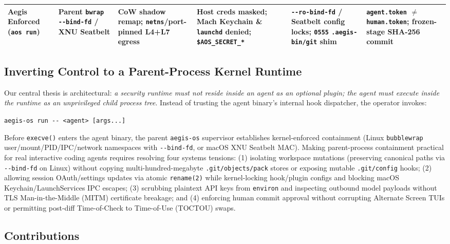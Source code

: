 \documentclass[10pt,twocolumn]{article}
\begin{document}
\begin{table}[!t]
\begin{tabularx}{\textwidth}{@{}l>{\raggedright\arraybackslash}p{2.62cm}YYYY@{}}
\midrule
\textbf{Aegis Enforced} (\texttt{aos run}) & \textbf{Parent \texttt{bwrap -\/-bind-fd} / XNU Seatbelt} & \textbf{CoW shadow remap; \texttt{netns}/port-pinned L4+L7 egress} & \textbf{Host creds masked; Mach Keychain \& \texttt{launchd} denied; \texttt{\$AOS\_SECRET\_*}} & \textbf{\texttt{-\/-ro-bind-fd} / Seatbelt config locks; \texttt{0555} \texttt{.aegis-bin/git} shim} & \textbf{\texttt{agent.token} $\neq$ \texttt{human.token}; frozen-stage SHA-256 commit} \\
\bottomrule
\end{tabularx}
\end{table}

\subsection{Inverting Control to a Parent-Process Kernel Runtime}

Our central thesis is architectural: \emph{a security runtime must not reside inside an agent as an optional plugin; the agent must execute inside the runtime as an unprivileged child process tree}. Instead of trusting the agent binary's internal hook dispatcher, the operator invokes:
\begin{center}
{\footnotesize\texttt{aegis-os run -\/- <agent> [args...]}}
\end{center}
Before \texttt{execve()} enters the agent binary, the parent \texttt{aegis-os} supervisor establishes kernel-enforced containment (Linux \texttt{bubblewrap}~\cite{containers2024bubblewrap} user/\allowbreak mount/\allowbreak PID/\allowbreak IPC/\allowbreak network namespaces with \texttt{-\/-bind-fd}, or macOS XNU Seatbelt MAC). Making parent-process containment practical for real interactive coding agents requires resolving four systems tensions: (1) isolating workspace mutations (preserving canonical paths via \texttt{-\/-bind-fd} on Linux) without copying multi-hundred-megabyte \texttt{.git/objects/pack} stores or exposing mutable \texttt{.git/config} hooks; (2) allowing session OAuth/settings updates via atomic \texttt{rename(2)} while kernel-locking hook/plugin configs and blocking macOS Keychain/LaunchServices IPC escapes; (3) scrubbing plaintext API keys from \texttt{environ} and inspecting outbound model payloads without TLS Man-in-the-Middle (MITM) certificate breakage; and (4) enforcing human commit approval without corrupting Alternate Screen TUIs or permitting post-diff Time-of-Check to Time-of-Use (TOCTOU) swaps.

\subsection{Contributions}
\end{document}
